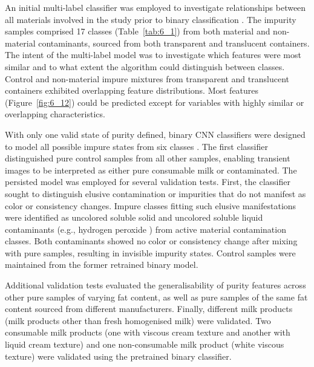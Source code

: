 \documentclass[12pt,a4paper,oneside]{report}
\begin{document}
An initial multi-label classifier was employed to investigate relationships between all materials involved in the study prior to binary classification \cite{bishop2006}. The impurity samples comprised 17 classes (Table~\ref{tab:6_1}) from both material and non-material contaminants, sourced from both transparent and translucent containers. The intent of the multi-label model was to investigate which features were most similar and to what extent the algorithm could distinguish between classes. Control and non-material impure mixtures from transparent and translucent containers exhibited overlapping feature distributions. Most features (Figure~\ref{fig:6_12}) could be predicted except for variables with highly similar or overlapping characteristics.

With only one valid state of purity defined, binary CNN classifiers were designed to model all possible impure states from six classes \cite{lecun1998}. The first classifier distinguished pure control samples from all other samples, enabling transient images to be interpreted as either pure consumable milk or contaminated. The persisted model was employed for several validation tests. First, the classifier sought to distinguish elusive contamination or impurities that do not manifest as color or consistency changes. Impure classes fitting such elusive manifestations were identified as uncolored soluble solid and uncolored soluble liquid contaminants (e.g., hydrogen peroxide \cite{gregory1961}) from active material contamination classes. Both contaminants showed no color or consistency change after mixing with pure samples, resulting in invisible impurity states. Control samples were maintained from the former retrained binary model.

Additional validation tests evaluated the generalisability of purity features across other pure samples of varying fat content, as well as pure samples of the same fat content sourced from different manufacturers. Finally, different milk products (milk products other than fresh homogenised milk) were validated. Two consumable milk products (one with viscous cream texture and another with liquid cream texture) and one non-consumable milk product (white viscous texture) were validated using the pretrained binary classifier.

\end{document}
